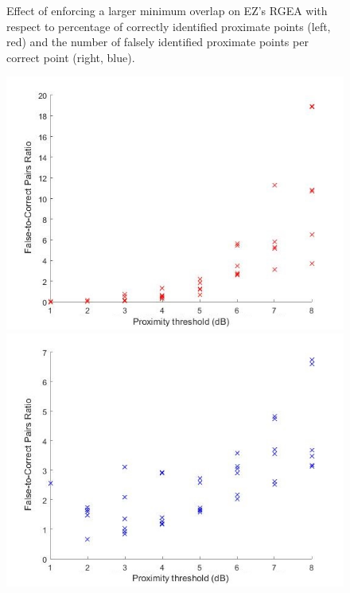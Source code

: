 \documentclass{UoYCSproject}
\begin{document}
\begin{figure}[h]
\begin{minipage}{0.5\textwidth}
                	\end{minipage}
                	\caption{Effect of enforcing a larger minimum overlap on EZ's RGEA with respect to percentage of correctly identified proximate points (left, red) and the number of falsely identified proximate points per correct point (right, blue).}
                \end{figure}
                
                \begin{figure}[h]
                	\label{fig:ez_prox_prox}
                	\centering
                	\begin{minipage}{0.5\textwidth}
                		\centering
                		\includegraphics[width=1\textwidth]{ez_prox_prox_correct.jpg}
                	\end{minipage}\hfill
                	\begin{minipage}{0.5\textwidth}
                		\centering
                		\includegraphics[width=1\textwidth]{ez_prox_prox_false.jpg}

\end{minipage}
\end{figure}
\end{document}
